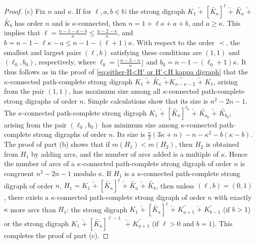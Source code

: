 \documentclass[a4paper,11pt]{article}
\begin{document}
\begin{proof}
(c) Fix \( n \) and $\kappa$. If for $\ell, a,b \in \mathbb{N}$ the strong digraph  
\( K_1 \; \overleftarrow{+} \; [ \overleftrightarrow{K_\kappa}]^{\ell} \; \overleftarrow{+} \; \overleftrightarrow{K_a} \; \overleftarrow{+} \; \) \(\overleftrightarrow{K_b} \) has order $n$ and is $\kappa$-connected, then $n=1 + \ell\kappa + a+b$, and 
$a \geq \kappa$. This implies that $\ell = \frac{n-1-a-b}{\kappa} \leq \frac{n-2-\kappa}{\kappa}$, and $b = n-1-\ell\kappa - a \leq n-1 - (\ell+1)\kappa$. With respect to the order $\prec$, the smallest and largest pairs $(\ell,b)$ satisfying 
these conditions are $(1,1)$ and $(\ell_0, b_0)$, respectively, where 
$\ell_0=\lfloor \frac{n-2-\kappa}{\kappa} \rfloor$ and $b_0=n-1- (\ell_0+1)\kappa$.  It thus follows as in the proof of \eqref{eq:either-H<H' or H'<H kappa digraph} that the 
$\kappa$-connected path-complete strong digraph $K_1 \; \overleftarrow{+} \; \overleftrightarrow{K_\kappa} \; \overleftarrow{+} \overleftrightarrow{K_{n-\kappa-2}} \; \overleftarrow{+} \; K_1$, arising from the pair $(1,1)$, has maximum size among all $\kappa$-connected path-complete strong digraphs of order $n$. Simple calculations show that its size is $n^2-2n-1$. The $\kappa$-connected path-complete strong digraph $K_1 \; \overleftarrow{+} \; [ \overleftrightarrow{K_\kappa}]^{\ell_0} \; \overleftarrow{+} \; \overleftrightarrow{K_{a_0}} \; \overleftarrow{+} \; \overleftrightarrow{K_{b_0}}$, arising from the pair
$(\ell_0,b_0)$ has minimum size among $\kappa$-connected path-complete strong digraphs of order $n$. Its size is $ \frac{n}{2}(3\kappa+n)-n-\kappa^2-b(\kappa-b)$.\\

The proof of part (b) shows that if $m(H_1) < m(H_2)$, then $H_2$ is obtained from $H_1$ by adding arcs, and the number of arcs added is a multiple of $\kappa$. Hence the number of arcs of a $\kappa$-connected path-complete strong digraph of order $n$ is congruent $n^2-2n-1$ modulo $\kappa$. If $H_1$ is a $\kappa$-connected path-complete strong digraph of order $n$, $H_1=K_1 \; \overleftarrow{+} \; [ \overleftrightarrow{K_\kappa}]^{\ell} \; \overleftarrow{+} \; \overleftrightarrow{K_a} \; \overleftarrow{+} \; \overleftrightarrow{K_b}$, then unless $(\ell,b)=(0,1)$, there exists a $\kappa$-connected path-complete strong digraph of order $n$ with exactly $\kappa$ more arcs than $H_1$: the strong digraph $K_1 \; \overleftarrow{+} \; [ \overleftrightarrow{K_\kappa}]^{\ell} \; \overleftarrow{+} \; \overleftrightarrow{K_{a+1}} \; \overleftarrow{+} \; \overleftrightarrow{K_{b-1}}$ (if $b>1$) or the strong digraph $K_1 \; \overleftarrow{+} \; [ \overleftrightarrow{K_\kappa}]^{\ell-1} \; $ $\overleftarrow{+} \; \overleftrightarrow{K_{a+1}}$ (if $\ell>0$ and $b=1$). This completes the proof of part (c).
\end{proof}
\end{document}
